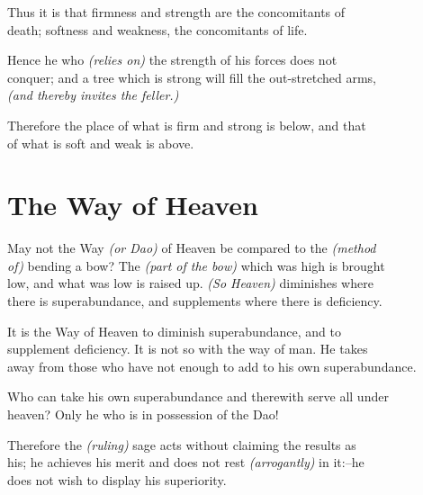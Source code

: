     Thus it is that firmness and strength are the concomitants of\\
    death; softness and weakness, the concomitants of life.\vspace{\baselineskip}
    
    Hence he who \textit{(relies on)} the strength of his forces does not\\
    conquer; and a tree which is strong will fill the out-stretched arms,\\
    \textit{(and thereby invites the feller.)}
    
    Therefore the place of what is firm and strong is below, and that\\
    of what is soft and weak is above.\vspace{\baselineskip}
    
\section*{The Way of Heaven}
    May not the Way \textit{(or Dao)} of Heaven be compared to the \textit{(method\\
    of)} bending a bow? The \textit{(part of the bow)} which was high is brought\\
    low, and what was low is raised up. \textit{(So Heaven)} diminishes where\\
    there is superabundance, and supplements where there is deficiency.\vspace{\baselineskip}
    
    It is the Way of Heaven to diminish superabundance, and to\\
    supplement deficiency. It is not so with the way of man. He takes\\
    away from those who have not enough to add to his own superabundance.\vspace{\baselineskip}
    
    Who can take his own superabundance and therewith serve all under\\
    heaven? Only he who is in possession of the Dao!\vspace{\baselineskip}
    
    Therefore the \textit{(ruling)} sage acts without claiming the results as\\
    his; he achieves his merit and does not rest \textit{(arrogantly)} in it:--he\\
    does not wish to display his superiority.\vspace{\baselineskip}
\newpage{}
